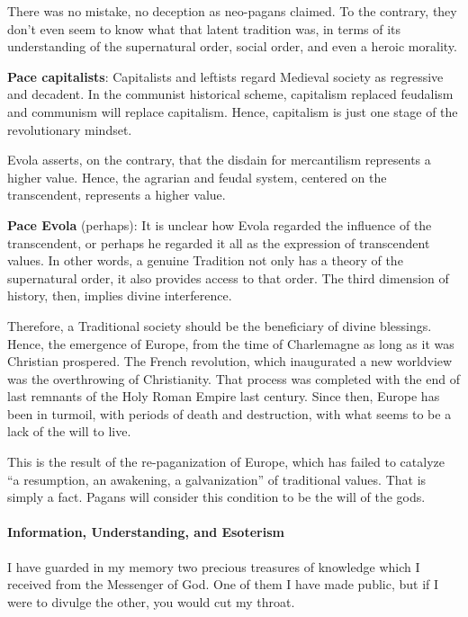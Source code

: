 There was no mistake, no deception as neo-pagans claimed. To the contrary, they don't even seem to know what that latent tradition was, in terms of its understanding of the supernatural order, social order, and even a heroic morality.

\textbf{Pace capitalists}: Capitalists and leftists regard Medieval society as regressive and decadent. In the communist historical scheme, capitalism replaced feudalism and communism will replace capitalism. Hence, capitalism is just one stage of the revolutionary mindset.

Evola asserts, on the contrary, that the disdain for mercantilism represents a higher value. Hence, the agrarian and feudal system, centered on the transcendent, represents a higher value.

\textbf{Pace Evola} (perhaps): It is unclear how Evola regarded the influence of the transcendent, or perhaps he regarded it all as the expression of transcendent values. In other words, a genuine Tradition not only has a theory of the supernatural order, it also provides access to that order. The third dimension of history, then, implies divine interference.

Therefore, a Traditional society should be the beneficiary of divine blessings. Hence, the emergence of Europe, from the time of Charlemagne as long as it was Christian prospered. The French revolution, which inaugurated a new worldview was the overthrowing of Christianity. That process was completed with the end of last remnants of the Holy Roman Empire last century. Since then, Europe has been in turmoil, with periods of death and destruction, with what seems to be a lack of the will to live.

This is the result of the re-paganization of Europe, which has failed to catalyze ``a resumption, an awakening, a galvanization'' of traditional values. That is simply a fact. Pagans will consider this condition to be the will of the gods.

\paragraph{Information, Understanding, and Esoterism}

\begin{quotex}
I have guarded in my memory two precious treasures of knowledge which I received from the Messenger of God. One of them I have made public, but if I were to divulge the other, you would cut my throat.
\end{quotex}


